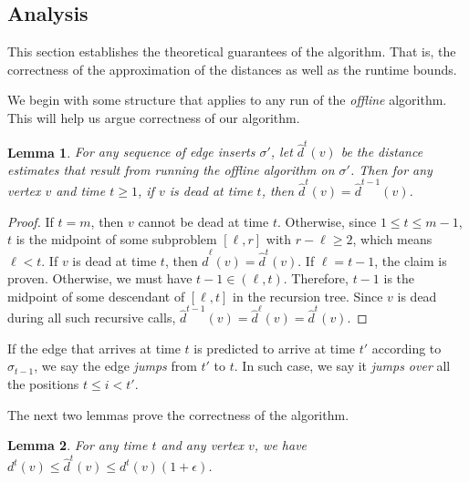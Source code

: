 \documentclass[11pt]{article}
\newtheorem{lemma}{Lemma}
\newcommand{\pred}{\hat{\sigma}}
\begin{document}
\subsection{Analysis}

This section establishes the theoretical guarantees of the algorithm. That is, the correctness of the approximation of the distances as well as the runtime bounds. 

We begin with some structure that applies to any run of the \emph{offline} algorithm.  This will help us argue correctness of our algorithm.
\begin{lemma}
\label{lem:dead_estimates_dont_change}
    For any sequence of edge inserts $\sigma'$, let $\hat{d}^t(v)$ be the distance estimates that result from running the offline algorithm on $\sigma'$.  Then 
    for any vertex $v$ and time $t \geq 1$, 
    if $v$ is dead at time $t$, then $\hat{d}^t(v) = \hat{d}^{t-1}(v)$.
\end{lemma}
\begin{proof}
    If $t = m$, then $v$ cannot be dead at time $t$.
    Otherwise, since $1 \leq t \leq m-1$, $t$ is the midpoint of some subproblem $[\ell, r]$ with $r-\ell \geq 2$, which means $\ell < t$.  If $v$ is dead at time $t$, then $\hat{d}^\ell(v) = \hat{d}^t(v)$.  
    If $\ell = t-1$, the claim is proven.
    Otherwise, we must have $t-1 \in (\ell, t)$.  Therefore, $t-1$ is the midpoint of some descendant of $[\ell, t]$ in the recursion tree.  Since $v$ is dead during all such recursive calls, $\hat{d}^{t-1}(v) = \hat{d}^\ell(v) = \hat{d}^t(v)$.
  \end{proof}
   
If the edge that arrives at time $t$ is predicted to arrive at time $t'$ according to $\pred_{t-1}$, we say the edge \emph{jumps} from $t'$ to $t$. In such case, we say it \emph{jumps over} all the positions $t \leq i < t'$. 

The next two lemmas prove the correctness of the algorithm. 

\begin{lemma}\label{lem:pred_approx}
    For any time $t$ and any vertex $v$, we have $d^t(v) \leq \hat{d}^t(v) \leq d^t(v)(1+\epsilon)$.
\end{lemma}
\end{document}

